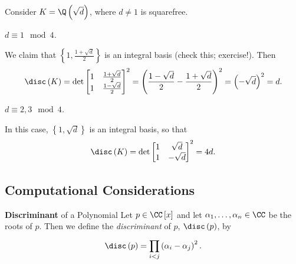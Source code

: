\documentclass[pmath441]{subfiles}
\begin{document}
    \begin{example}{}
        Consider $K = \Q\left( \sqrt{d} \right)$, where $d\neq 1$ is squarefree.
        
        \begin{case}
            \textit{$d\equiv 1\mod 4$.}

            We claim that $\left\lbrace 1,\frac{1+\sqrt{d}}{2} \right\rbrace$ is an integral basis (check this; exercise!). Then
            \begin{equation*}
                \disc\left( K \right) = \det
                \begin{bmatrix}
                	1 & \frac{1+\sqrt{d}}{2} \\
                	1 & \frac{1-\sqrt{d}}{2} \\
                \end{bmatrix}^{2} =
                \left( \frac{1-\sqrt{d}}{2}-\frac{1+\sqrt{d}}{2} \right)^{2} = \left( -\sqrt{d} \right)^{2} = d.
            \end{equation*}
        \end{case}

        \begin{case}
            \textit{$d\equiv 2,3\mod 4$.}

            In this case, $\left\lbrace 1,\sqrt{d} \right\rbrace$ is an integral basis, so that
            \begin{equation*}
                \disc\left( K \right) = \det
                \begin{bmatrix}
                	1 & \sqrt{d} \\
                	1 & -\sqrt{d} \\
                \end{bmatrix}^{2} = 4d.
            \end{equation*}
        \end{case}
    \end{example}
    
    \rruleline
    
    \subsection{Computational Considerations}

    \begin{recall}{\textbf{Discriminant} of a Polynomial}
        Let $p\in\CC\left[ x \right]$ and let $\alpha_1,\ldots,\alpha_n\in\CC$ be the roots of $p$. Then we define the \textit{discriminant} of $p$, $\disc\left( p \right)$, by
        \begin{equation*}
            \disc\left( p \right) = \prod^{}_{i<j} \left( \alpha_i-\alpha_j \right)^{2}.
        \end{equation*}
    \end{recall}
\end{document}
